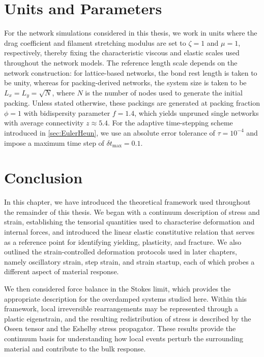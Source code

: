 \documentclass[asymmetricmargins]{library/duthesis}%
\begin{document}
\section{Units and Parameters}
For the network simulations considered in this thesis, we work in units where the drag coefficient and filament stretching modulus are set to $\zeta = 1$ and $\mu = 1$, respectively, thereby fixing the characteristic viscous and elastic scales used throughout the network models. The reference length scale depends on the network construction: for lattice-based networks, the bond rest length is taken to be unity, whereas for packing-derived networks, the system size is taken to be $L_x = L_y = \sqrt{N}$, where $N$ is the number of nodes used to generate the initial packing. Unless stated otherwise, these packings are generated at packing fraction $\phi = 1$ with bidispersity parameter $f = 1.4$, which yields unpruned single networks with average connectivity $z \approx 5.4$. For the adaptive time-stepping scheme introduced in \cref{sec:EulerHeun}, we use an absolute error tolerance of $\tau = 10^{-4}$ and impose a maximum time step of $\delta t_{\max} = 0.1$.

\section{Conclusion}
    In this chapter, we have introduced the theoretical framework used throughout the remainder of this thesis. We began with a continuum description of stress and strain, establishing the tensorial quantities used to characterise deformation and internal forces, and introduced the linear elastic constitutive relation that serves as a reference point for identifying yielding, plasticity, and fracture. We also outlined the strain-controlled deformation protocols used in later chapters, namely oscillatory strain, step strain, and strain startup, each of which probes a different aspect of material response.

    We then considered force balance in the Stokes limit, which provides the appropriate description for the overdamped systems studied here. Within this framework, local irreversible rearrangements may be represented through a plastic eigenstrain, and the resulting redistribution of stress is described by the Oseen tensor and the Eshelby stress propagator. These results provide the continuum basis for understanding how local events perturb the surrounding material and contribute to the bulk response.
\end{document}
